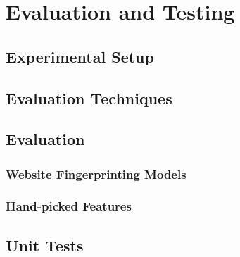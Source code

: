 \section{Evaluation and Testing}

\subsection{Experimental Setup}

\subsection{Evaluation Techniques}


\subsection{Evaluation}


\subsubsection{Website Fingerprinting Models}



\subsubsection{Hand-picked Features}



\subsection{Unit Tests}
